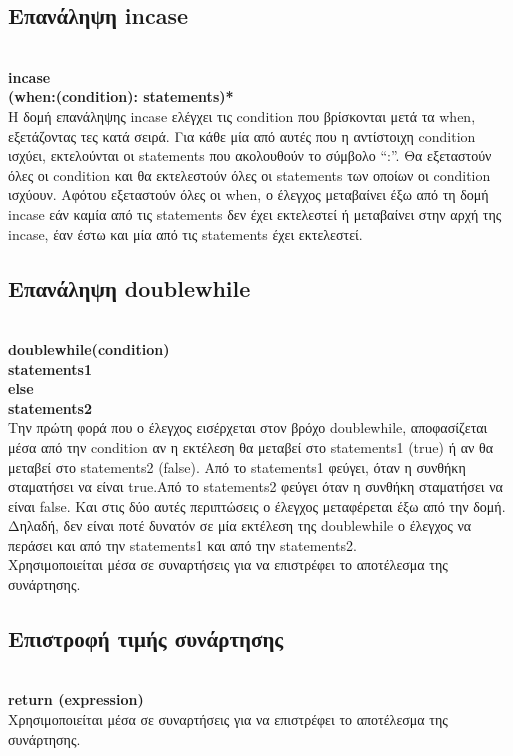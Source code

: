 \documentclass[12pt,a4paper,a4paper]{report}
\begin{document}
 \subsection{Επανάληψη incase}
  \hspace{10mm}\\
   \textbf{incase\\\hspace*{10mm}(when:(condition): statements)*}\\
Η δομή επανάληψης incase ελέγχει τις condition που βρίσκονται μετά τα when,     εξετάζοντας τες κατά σειρά. Για κάθε μία από αυτές που η αντίστοιχη condition ισχύει, εκτελούνται οι statements που ακολουθούν το σύμβολο “:”. Θα εξεταστούν όλες οι condition και θα εκτελεστούν όλες οι statements των οποίων οι condition ισχύουν. Αφότου εξεταστούν όλες οι when, ο έλεγχος μεταβαίνει έξω από τη δομή incase εάν καμία από τις statements δεν έχει εκτελεστεί ή μεταβαίνει στην αρχή της incase, έαν έστω και μία από τις statements έχει εκτελεστεί.\\
 \subsection{Επανάληψη doublewhile}
  \hspace{10mm}\\
\textbf{doublewhile(condition)\\\hspace*{10mm} statements1\\else\\\hspace*{10mm}statements2}\\
Tην πρώτη φορά που ο έλεγχος εισέρχεται στον βρόχο doublewhile, αποφασίζεται μέσα από την condition αν η εκτέλεση θα μεταβεί στο statements1 (true) ή αν θα μεταβεί στο statements2 (false). Από το statements1 φεύγει, όταν η συνθήκη σταματήσει να είναι true.Από το statements2 φεύγει όταν η συνθήκη σταματήσει να είναι false. Και στις δύο αυτές περιπτώσεις ο έλεγχος μεταφέρεται έξω από την δομή. Δηλαδή, δεν είναι ποτέ δυνατόν σε μία εκτέλεση της doublewhile ο έλεγχος να περάσει και από την statements1 και από την statements2.\\
Xρησιμοποιείται μέσα σε συναρτήσεις για να επιστρέφει το αποτέλεσμα της συνάρτησης.\\
 \subsection{Επιστροφή τιμής συνάρτησης}
   \hspace{10mm}\\
\textbf{return (expression)}\\
Xρησιμοποιείται μέσα σε συναρτήσεις για να επιστρέφει το αποτέλεσμα της συνάρτησης.\\
\end{document}
